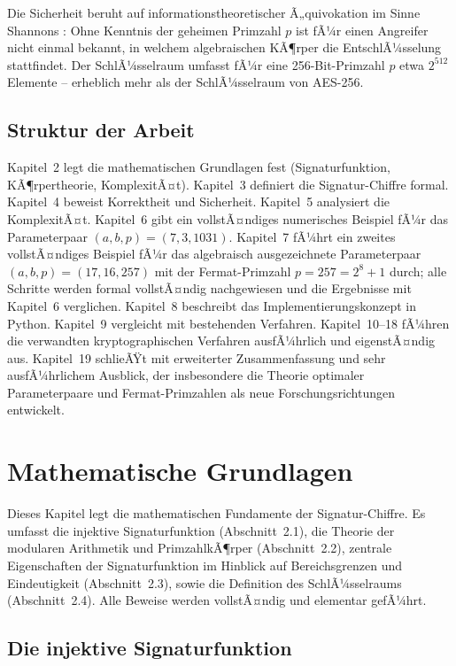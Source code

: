 ﻿\documentclass[a4paper,12pt]{scrreprt}
\theoremstyle{definition}
\begin{document}
Die Sicherheit beruht auf informationstheoretischer Ã„quivokation im Sinne Shannons \cite{Sha49}: Ohne Kenntnis der geheimen Primzahl $p$ ist fÃ¼r einen Angreifer nicht einmal bekannt, in welchem algebraischen KÃ¶rper die EntschlÃ¼sselung stattfindet. Der SchlÃ¼sselraum umfasst fÃ¼r eine 256-Bit-Primzahl $p$ etwa $2^{512}$ Elemente -- erheblich mehr als der SchlÃ¼sselraum von AES-256.

\subsection{Struktur der Arbeit}

Kapitel~2 legt die mathematischen Grundlagen fest (Signaturfunktion, KÃ¶rpertheorie, KomplexitÃ¤t). Kapitel~3 definiert die Signatur-Chiffre formal. Kapitel~4 beweist Korrektheit und Sicherheit. Kapitel~5 analysiert die KomplexitÃ¤t. Kapitel~6 gibt ein vollstÃ¤ndiges numerisches Beispiel fÃ¼r das Parameterpaar $(a,b,p)=(7,3,1031)$. Kapitel~7 fÃ¼hrt ein zweites vollstÃ¤ndiges Beispiel fÃ¼r das algebraisch ausgezeichnete Parameterpaar $(a,b,p)=(17,16,257)$ mit der Fermat-Primzahl $p=257=2^8+1$ durch; alle Schritte werden formal vollstÃ¤ndig nachgewiesen und die Ergebnisse mit Kapitel~6 verglichen. Kapitel~8 beschreibt das Implementierungskonzept in Python. Kapitel~9 vergleicht mit bestehenden Verfahren. Kapitel~10--18 fÃ¼hren die verwandten kryptographischen Verfahren ausfÃ¼hrlich und eigenstÃ¤ndig aus. Kapitel~19 schlieÃŸt mit erweiterter Zusammenfassung und sehr ausfÃ¼hrlichem Ausblick, der insbesondere die Theorie optimaler Parameterpaare und Fermat-Primzahlen als neue Forschungsrichtungen entwickelt.

\section{Mathematische Grundlagen}

Dieses Kapitel legt die mathematischen Fundamente der Signatur-Chiffre. Es umfasst die injektive Signaturfunktion (Abschnitt~2.1), die Theorie der modularen Arithmetik und PrimzahlkÃ¶rper (Abschnitt~2.2), zentrale Eigenschaften der Signaturfunktion im Hinblick auf Bereichsgrenzen und Eindeutigkeit (Abschnitt~2.3), sowie die Definition des SchlÃ¼sselraums (Abschnitt~2.4). Alle Beweise werden vollstÃ¤ndig und elementar gefÃ¼hrt.

\subsection{Die injektive Signaturfunktion}
\end{document}
